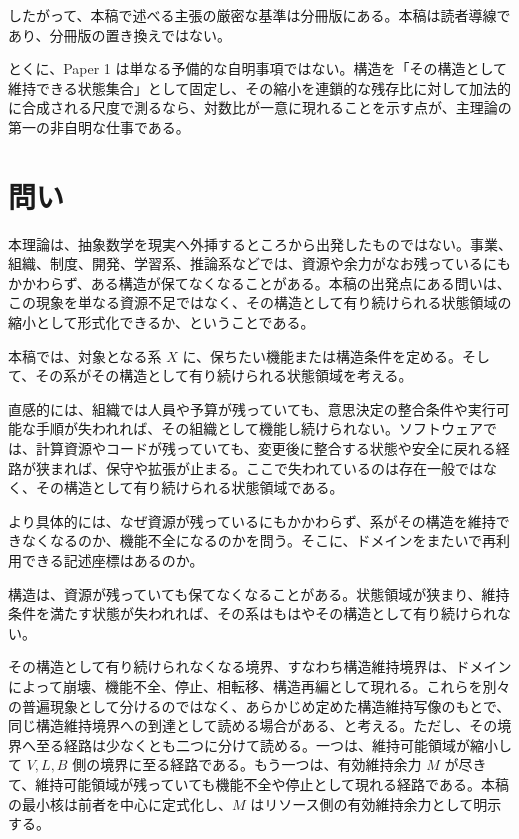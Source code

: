 \documentclass[12pt,a4paper]{article}
\begin{document}
したがって、本稿で述べる主張の厳密な基準は分冊版にある。本稿は読者導線であり、分冊版の置き換えではない。

とくに、Paper 1 は単なる予備的な自明事項ではない。構造を「その構造として維持できる状態集合」として固定し、その縮小を連鎖的な残存比に対して加法的に合成される尺度で測るなら、対数比が一意に現れることを示す点が、主理論の第一の非自明な仕事である。

\section{問い}\label{ux554fux3044}

本理論は、抽象数学を現実へ外挿するところから出発したものではない。事業、組織、制度、開発、学習系、推論系などでは、資源や余力がなお残っているにもかかわらず、ある構造が保てなくなることがある。本稿の出発点にある問いは、この現象を単なる資源不足ではなく、その構造として有り続けられる状態領域の縮小として形式化できるか、ということである。

本稿では、対象となる系 \(X\) に、保ちたい機能または構造条件を定める。そして、その系がその構造として有り続けられる状態領域を考える。

直感的には、組織では人員や予算が残っていても、意思決定の整合条件や実行可能な手順が失われれば、その組織として機能し続けられない。ソフトウェアでは、計算資源やコードが残っていても、変更後に整合する状態や安全に戻れる経路が狭まれば、保守や拡張が止まる。ここで失われているのは存在一般ではなく、その構造として有り続けられる状態領域である。

より具体的には、なぜ資源が残っているにもかかわらず、系がその構造を維持できなくなるのか、機能不全になるのかを問う。そこに、ドメインをまたいで再利用できる記述座標はあるのか。

構造は、資源が残っていても保てなくなることがある。状態領域が狭まり、維持条件を満たす状態が失われれば、その系はもはやその構造として有り続けられない。

その構造として有り続けられなくなる境界、すなわち構造維持境界は、ドメインによって崩壊、機能不全、停止、相転移、構造再編として現れる。これらを別々の普遍現象として分けるのではなく、あらかじめ定めた構造維持写像のもとで、同じ構造維持境界への到達として読める場合がある、と考える。ただし、その境界へ至る経路は少なくとも二つに分けて読める。一つは、維持可能領域が縮小して \(V,L,B\) 側の境界に至る経路である。もう一つは、有効維持余力 \(M\) が尽きて、維持可能領域が残っていても機能不全や停止として現れる経路である。本稿の最小核は前者を中心に定式化し、\(M\) はリソース側の有効維持余力として明示する。
\end{document}

